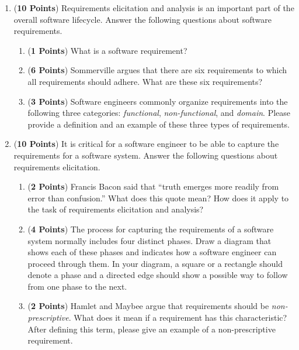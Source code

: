 \begin{enumerate}

\item ({\bf 10 Points}) Requirements elicitation and analysis is an
  important part of the overall software lifecycle.  Answer the
  following questions about software requirements.

\begin{enumerate}

\item ({\bf 1 Points}) What is a software requirement?

\item ({\bf 6 Points}) Sommerville argues that there are six
  requirements to which all requirements should adhere.  What are
  these six requirements?

\item ({\bf 3 Points}) Software engineers commonly organize
  requirements into the following three categories: {\em functional},
  {\em non-functional}, and {\em domain}.  Please provide a definition
  and an example of these three types of requirements.

\end{enumerate}

\newpage

\item ({\bf 10 Points}) It is critical for a software engineer to be
  able to capture the requirements for a software system.  Answer the
  following questions about requirements elicitation.

\begin{enumerate}

\item ({\bf 2 Points}) Francis Bacon said that ``truth emerges more
  readily from error than confusion.''  What does this quote mean?
  How does it apply to the task of requirements elicitation and
  analysis?

\item ({\bf 4 Points}) The process for capturing the requirements of a
  software system normally includes four distinct phases.  Draw a
  diagram that shows each of these phases and indicates how a software
  engineer can proceed through them.  In your diagram, a square or a
  rectangle should denote a phase and a directed edge should show a
  possible way to follow from one phase to the next.

\item ({\bf 2 Points}) Hamlet and Maybee argue that requirements
  should be {\em non-prescriptive}.  What does it mean if a
  requirement has this characteristic?  After defining this term,
  please give an example of a non-prescriptive requirement.


\end{enumerate}
\end{enumerate}
